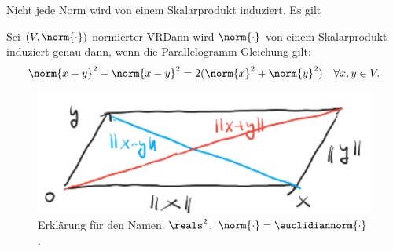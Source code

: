 Nicht jede Norm wird von einem Skalarprodukt induziert. Es gilt
\begin{lemma}
    Sei \( (V,\norm{\cdot}) \) normierter VR\@ Dann wird \( \norm{\cdot} \) von einem Skalarprodukt induziert genau dann, wenn die Parallelogramm-Gleichung gilt:
    \begin{align*}
        \norm{x+y}^2-\norm{x-y}^2=2(\norm{x}^2+\norm{y}^2)\quad \forall x,y\in V.
    \end{align*}
    \begin{figure}[H]
        \centering
        \includegraphics[width=0.5\linewidth]{figures/parallelogramm_gleichung_namenserklaerung}
        \caption*{Erklärung für den Namen. \( \reals^2 \), \( \norm{\cdot}=\euclidiannorm{\cdot} \).}
        \label{fig:parallelogramm_gleichung_namenserklaerung}
    \end{figure}    
\end{lemma}
